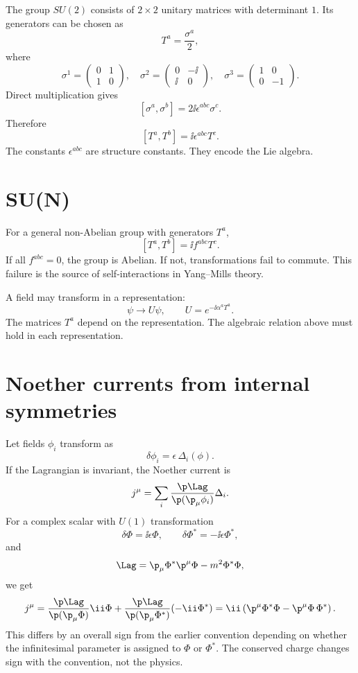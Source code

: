 The group \(SU(2)\) consists of \(2\times2\) unitary matrices with determinant \(1\).  Its generators can be chosen as
\[
  T^a=\frac{\sigma^a}{2},
\]
where
\[
  \sigma^1=
  \begin{pmatrix}0&1\\1&0\end{pmatrix},
  \quad
  \sigma^2=
  \begin{pmatrix}0&-\ii\\ \ii&0\end{pmatrix},
  \quad
  \sigma^3=
  \begin{pmatrix}1&0\\0&-1\end{pmatrix}.
\]
Direct multiplication gives
\[
  [\sigma^a,\sigma^b]=2\ii\epsilon^{abc}\sigma^c.
\]
Therefore
\[
  [T^a,T^b]=\ii\epsilon^{abc}T^c.
\]
The constants \(\epsilon^{abc}\) are structure constants.  They encode the Lie algebra.

\section{SU(N)}

For a general non-Abelian group with generators \(T^a\),
\[
  [T^a,T^b]=\ii f^{abc}T^c.
\]
If all \(f^{abc}=0\), the group is Abelian.  If not, transformations fail to commute.  This failure is the source of self-interactions in Yang--Mills theory.

A field may transform in a representation:
\[
  \psi\to U\psi,
  \qquad
  U=e^{-\ii\alpha^aT^a}.
\]
The matrices \(T^a\) depend on the representation.  The algebraic relation above must hold in each representation.

\section{Noether currents from internal symmetries}

Let fields \(\phi_i\) transform as
\[
  \delta\phi_i=\epsilon\,\Delta_i(\phi).
\]
If the Lagrangian is invariant, the Noether current is
\[
  j^\mu=
  \sum_i
  \frac{\p\Lag}{\p(\p_\mu\phi_i)}
  \Delta_i.
\]
For a complex scalar with \(U(1)\) transformation
\[
  \delta\Phi=\ii\epsilon\Phi,
  \qquad
  \delta\Phi^*=-\ii\epsilon\Phi^*,
\]
and
\[
  \Lag=\p_\mu\Phi^*\p^\mu\Phi-m^2\Phi^*\Phi,
\]
we get
\[
  j^\mu=
  \frac{\p\Lag}{\p(\p_\mu\Phi)}\ii\Phi
  +
  \frac{\p\Lag}{\p(\p_\mu\Phi^*)}(-\ii\Phi^*)
  =
  \ii\left(\p^\mu\Phi^*\Phi-\p^\mu\Phi\,\Phi^*\right).
\]
This differs by an overall sign from the earlier convention depending on whether the infinitesimal parameter is assigned to \(\Phi\) or \(\Phi^*\).  The conserved charge changes sign with the convention, not the physics.

